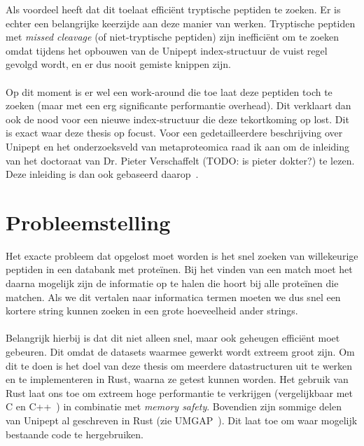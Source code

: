 \documentclass[11pt,dutch,faculty=we,layout=titlefont,underline=false,titleUppercase=true,titleUnderline=true]{ugent2016-report}
\begin{document}
    \leavevmode\newline
    Als voordeel heeft dat dit toelaat efficiënt tryptische peptiden te zoeken.
    Er is echter een belangrijke keerzijde aan deze manier van werken.
    Tryptische peptiden met \textit{missed cleavage} (of niet-tryptische peptiden) zijn inefficiënt om te zoeken omdat tijdens het opbouwen van de Unipept index-structuur de vuist regel gevolgd wordt, en er dus nooit gemiste knippen zijn.
    \\ \\
    Op dit moment is er wel een work-around die toe laat deze peptiden toch te zoeken (maar met een erg significante performantie overhead).
    Dit verklaart dan ook de nood voor een nieuwe index-structuur die deze tekortkoming op lost.
    Dit is exact waar deze thesis op focust.
    \newline
    Voor een gedetailleerdere beschrijving over Unipept en het onderzoeksveld van metaproteomica raad ik aan om de inleiding van het doctoraat van Dr. Pieter Verschaffelt (TODO: is pieter dokter?) te lezen.
    Deze inleiding is dan ook gebaseerd daarop~\cite{phdPieterUnipept}.


    \section{Probleemstelling}\label{sec:probleemstelling}
    Het exacte probleem dat opgelost moet worden is het snel zoeken van willekeurige peptiden in een databank met proteïnen.
    Bij het vinden van een match moet het daarna mogelijk zijn de informatie op te halen die hoort bij alle proteïnen die matchen.
    Als we dit vertalen naar informatica termen moeten we dus snel een kortere string kunnen zoeken in een grote hoeveelheid ander strings.
    \\ \\
    Belangrijk hierbij is dat dit niet alleen snel, maar ook geheugen efficiënt moet gebeuren.
    Dit omdat de datasets waarmee gewerkt wordt extreem groot zijn.
    Om dit te doen is het doel van deze thesis om meerdere datastructuren uit te werken en te implementeren in Rust, waarna ze getest kunnen worden.
    Het gebruik van Rust laat ons toe om extreem hoge performantie te verkrijgen (vergelijkbaar met C en C++~\cite{rustPerformantie}) in combinatie met \textit{memory safety}.
    Bovendien zijn sommige delen van Unipept al geschreven in Rust (zie UMGAP~\cite{UMGAP_paper, UMGAP_source}).
    Dit laat toe om waar mogelijk bestaande code te hergebruiken.
\end{document}
